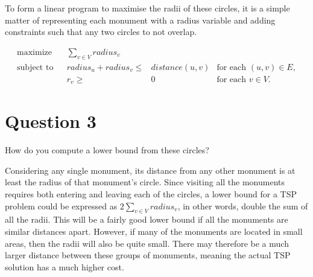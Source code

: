 \documentclass[a4paper, 10pt, oneside, article]{memoir}
\begin{document}
To form a linear program to maximise the radii of these circles, it is a simple matter of representing each monument with a radius variable and adding constraints such that any two circles to not overlap.

\begin{align*}
  \text{maximize} && \sum_{v\in V} radius_{v} \\
  \text{subject to} && radius_{u} + radius_{v} \leq{}& distance(u,v) & \text{for each $(u,v) \in E$}, \\
                    && r_{v} \geq{}& 0 & \text{for each $v \in V$}.
\end{align*}

\section*{Question 3}
How do you compute a lower bound from these circles?

Considering any single monument, its distance from any other monument is at least the radius of that monument's circle. Since visiting all the monuments requires both entering and leaving each of the circles, a lower bound for a TSP problem could be expressed as $2 \sum_{v \in V} radius_{v}$, in other words, double the sum of all the radii.
This will be a fairly good lower bound if all the monuments are similar distances apart. However, if many of the monuments are located in small areas, then the radii will also be quite small. There may therefore be a much larger distance between these groups of monuments, meaning the actual TSP solution has a much higher cost.



\end{document}

